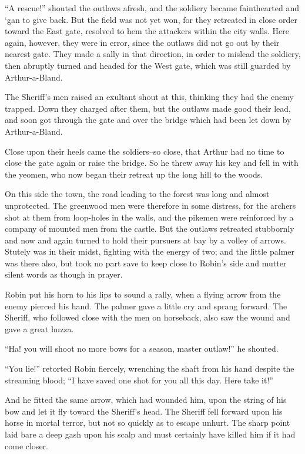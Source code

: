 ``A rescue!'' shouted the outlaws afresh, and the soldiery became
fainthearted and `gan to give back. But the field was not yet won, for
they retreated in close order toward the East gate, resolved to hem the
attackers within the city walls. Here again, however, they were in
error, since the outlaws did not go out by their nearest gate. They made
a sally in that direction, in order to mislead the soldiery, then
abruptly turned and headed for the West gate, which was still guarded by
Arthur-a-Bland.

The Sheriff's men raised an exultant shout at this, thinking they had
the enemy trapped. Down they charged after them, but the outlaws made
good their lead, and soon got through the gate and over the bridge which
had been let down by Arthur-a-Bland.

Close upon their heels came the soldiers--so close, that Arthur had no
time to close the gate again or raise the bridge. So he threw away his
key and fell in with the yeomen, who now began their retreat up the long
hill to the woods.

On this side the town, the road leading to the forest was long and
almost unprotected. The greenwood men were therefore in some distress,
for the archers shot at them from loop-holes in the walls, and the
pikemen were reinforced by a company of mounted men from the castle. But
the outlaws retreated stubbornly and now and again turned to hold their
pursuers at bay by a volley of arrows. Stutely was in their midst,
fighting with the energy of two; and the little palmer was there also,
but took no part save to keep close to Robin's side and mutter silent
words as though in prayer.

Robin put his horn to his lips to sound a rally, when a flying arrow
from the enemy pierced his hand. The palmer gave a little cry and sprang
forward. The Sheriff, who followed close with the men on horseback, also
saw the wound and gave a great huzza.

``Ha! you will shoot no more bows for a season, master outlaw!'' he
shouted.

``You lie!'' retorted Robin fiercely, wrenching the shaft from his hand
despite the streaming blood; ``I have saved one shot for you all this
day. Here take it!''

And he fitted the same arrow, which had wounded him, upon the string of
his bow and let it fly toward the Sheriff's head. The Sheriff fell
forward upon his horse in mortal terror, but not so quickly as to escape
unhurt. The sharp point laid bare a deep gash upon his scalp and must
certainly have killed him if it had come closer.


